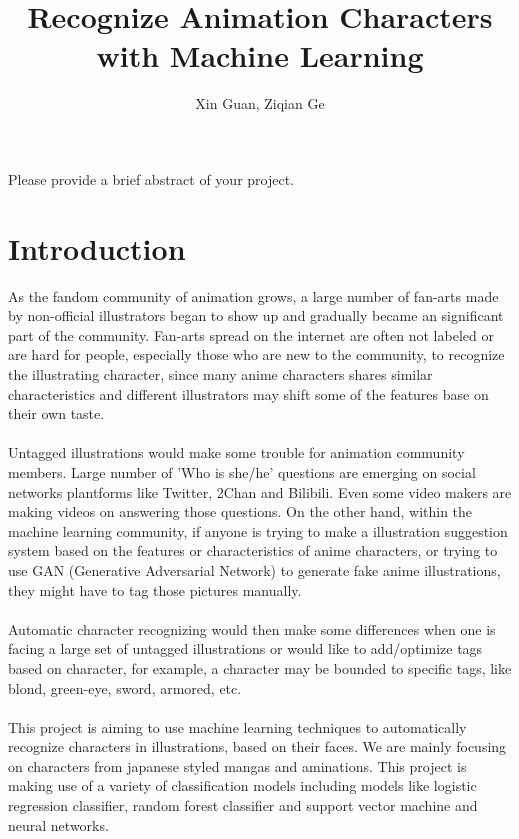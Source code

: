 \documentclass[11.5pt]{article}
\title{Recognize Animation Characters with Machine Learning}
\author{Xin Guan, Ziqian Ge}
\date{}
\begin{document}
    \maketitle

    \abstract
    Please provide a brief abstract of your project.

    \vspace{2mm}


    \section{Introduction}
    As the fandom community of animation grows, a large number of fan-arts made by non-official illustrators began to show up and gradually became an significant part of the community.
    Fan-arts spread on the internet are often not labeled or are hard for people, especially those who are new to the community, to recognize the illustrating character, since many anime characters shares similar characteristics and different illustrators may shift some of the features base on their own taste.\\ \\
    Untagged illustrations would make some trouble for animation community members.
    Large number of 'Who is she/he' questions are emerging on social networks plantforms like Twitter, 2Chan and Bilibili.
    Even some video makers are making videos on answering those questions.
    On the other hand, within the machine learning community, if anyone is trying to make a illustration suggestion system based on the features or characteristics of anime characters, or trying to use GAN (Generative Adversarial Network) to generate fake anime illustrations, they might have to tag those pictures manually.\\ \\
    Automatic character recognizing would then make some differences when one is facing a large set of untagged illustrations or would like to add/optimize tags based on character, for example, a character may be bounded to specific tags, like blond, green-eye, sword, armored, etc.\\ \\
    This project is aiming to use machine learning techniques to automatically recognize characters in illustrations, based on their faces. We are mainly focusing on characters from japanese styled mangas and aminations. This project is making use of a variety of classification models including models like logistic regression classifier, random forest classifier and support vector machine and neural networks.\\ \\
\end{document}
